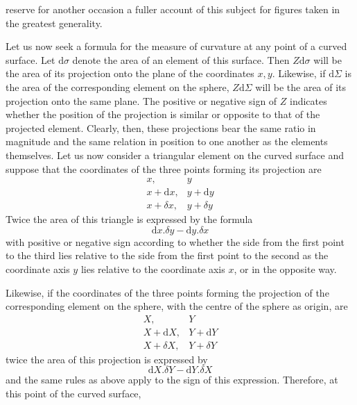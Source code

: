 %
reserve for another occasion a fuller account of this subject for figures taken in the greatest generality.

Let us now seek a formula for the measure of curvature at any point of a curved surface. Let \(\mathrm{d}\sigma\) denote the area of an element of this surface. Then \(Z\mathrm{d}\sigma\) will be the area of its projection onto the plane of the coordinates \(x,y\). Likewise, if \(\mathrm{d}\Sigma\) is the area of the corresponding element on the sphere, \(Z\mathrm{d}\Sigma\) will be the area of its projection onto the same plane. The positive or negative sign of \(Z\) indicates whether the position of the projection is similar or opposite to that of the projected element. Clearly, then, these projections bear the same ratio in magnitude and the same relation in position to one another as the elements themselves. Let us now consider a triangular element on the curved surface and suppose that the coordinates of the three points forming its projection are
\[
\begin{array}{ll}
x,&y\\
x+\mathrm{d}x,&y+\mathrm{d}y\\
x+\delta x,&y+\delta y
\end{array}
\]
Twice the area of this triangle is expressed by the formula
\[
\mathrm{d}x\mathord{.}\delta y-\mathrm{d}y\mathord{.}\delta x
\]
with positive or negative sign according to whether the side from the first point to the third lies relative to the side from the first point to the second as the coordinate axis \(y\) lies relative to the coordinate axis \(x\), or in the opposite way.

Likewise, if the coordinates of the three points forming the projection of the corresponding element on the sphere, with the centre of the sphere as origin, are
\[
\begin{array}{ll}
X,&Y\\
X+\mathrm{d}X,&Y+\mathrm{d}Y\\
X+\delta X,&Y+\delta Y
\end{array}
\]
twice the area of this projection is expressed by
\[
\mathrm{d}X\mathord{.}\delta Y-\mathrm{d}Y\mathord{.}\delta X
\]
and the same rules as above apply to the sign of this expression. Therefore, at this point of the curved surface, %
